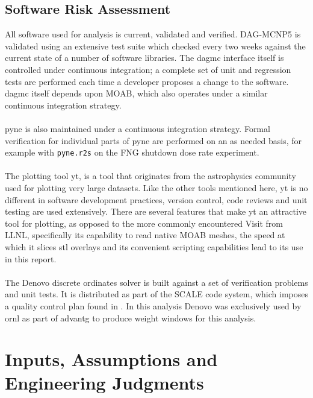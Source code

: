 \documentclass[12pt]{article}
\begin{document}
\subsection{Software Risk Assessment}
All software used for analysis is current, validated and verified. DAG-MCNP5
is validated using an extensive test suite which checked every two weeks against
the current state of a number of software libraries.  The \gls{dagmc} interface
itself is controlled under continuous integration; a complete set of unit and
regression tests are performed each time a developer proposes a change to the
software.  \gls{dagmc} itself depends upon MOAB, which also operates under a
similar continuous integration strategy.
\\
\\
\gls{pyne} is also maintained under a continuous integration strategy.  
Formal verification for individual parts of \gls{pyne} are performed on an as
needed basis, for example with \texttt{pyne.r2s} on the FNG shutdown dose rate
experiment. \cite{Biondo201677}
\\
\\
The plotting tool yt, is a tool that originates from the astrophysics community used
for plotting very large datasets. Like the other tools mentioned here, yt is no different
in software development practices, version control, code reviews and unit testing are
used extensively. There are several features that make yt an attractive 
tool for plotting, as opposed to the more commonly encountered Visit from LLNL, specifically
its capability to read native MOAB meshes, the speed at which it slices stl overlays and 
its convenient scripting capabilities lead to its use in this report.
\\
\\
The Denovo discrete ordinates solver is built against a set of verification 
problems and unit tests. It is distributed as part of the SCALE code system, which imposes
a quality control plan found in \cite{scale_qa}. In this analysis Denovo was exclusively
used by \gls{ornl} as part of \gls{advantg} to produce weight windows for this analysis.

\clearpage
\newpage
\section{Inputs, Assumptions and Engineering Judgments}
\end{document}
